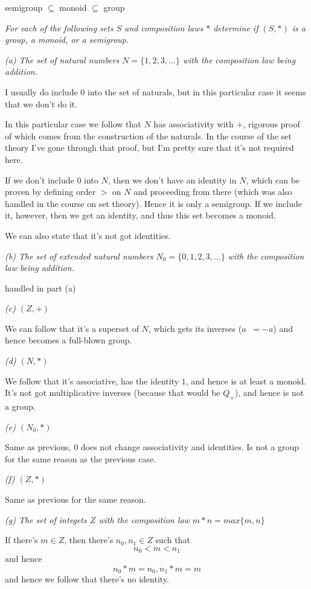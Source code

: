 \documentclass[11pt,oneside,titlepage]{book}
\DeclareMathOperator \inv {^{-1}}
\newcommand{\set}[1]{\{ #1 \}}
\begin{document}
semigroup $\subseteq$ monoid $\subseteq$ group

\textit{For each of the following sets $S$ and composition laws $*$
determine if $(S, *)$ is a group, a monoid, or a semigroup.}

\textit{(a) The set of natural numbers $N = \set{1, 2, 3,
    ...}$ with the composition law being addition.}

I usually do include $0$ into the set of naturals, but in this particular case
it seems that we don't do it.

In this particular case we follow that $N$ has associativity with $+$,
rigorous proof of which comes from the construction of the naturals.
In the course of the set theory I've gone through that proof, but
I'm pretty sure that it's not required here.

If we don't include $0$ into $N$, then we don't have an identity in
$N$, which can be proven by defining order $>$ on $N$ and proceeding
from there (which was also handled in the course on set theory).
Hence it is only a semigroup. If we include it, however, then we get an
identity, and thus this set becomes a monoid.

We can also state that it's not got identities.

\textit{(b) The set of extended  natural numbers $N_0 = \set{0, 1, 2, 3,
    ...}$ with the composition law being addition.}

handled in part (a)

\textit{(c) $(Z, +)$}

We can follow that it's a superset of $N$, which gets its inverses ($a\inv = -a$)
and hence becomes a full-blown group.

\textit{(d) $(N, *)$}

We follow that it's associative, has the identity $1$, and hence is at
least a monoid. It's not got multiplicative inverses (because that
would be $Q_+$), and hence is not a group.

\textit{(e) $(N_0, *)$}

Same as previous, $0$ does not change associativity and identities. Is
not a group for the same reason as the previous case.

\textit{(f) $(Z, *)$}

Same as previous for the same reason.

\textit{(g) The set of integets $Z$ with the composition law $m * n = max\set{m, n}$}

If there's $m \in Z$, then there's $n_0, n_1 \in Z$ such that
$$n_0 < m < n_1$$
and hence
$$n_0 * m = n_0, n_1 * m = m$$
and hence we follow that there's no identity.
\end{document}
